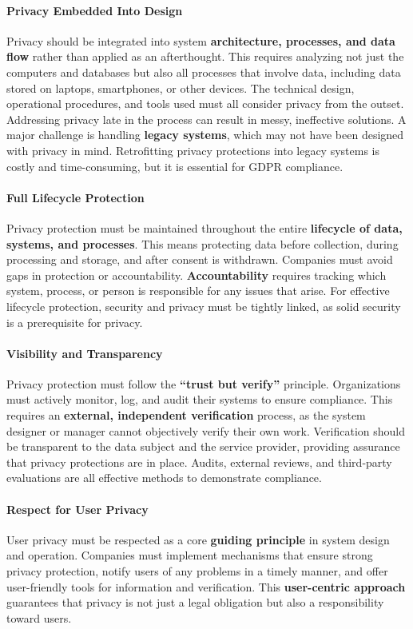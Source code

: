 \paragraph{Privacy Embedded Into Design}  
Privacy should be integrated into system \textbf{architecture,
processes, and data flow} rather than applied as an afterthought. This
requires analyzing not just the computers and databases but also all
processes that involve data, including data stored on laptops,
smartphones, or other devices. The technical design, operational
procedures, and tools used must all consider privacy from the outset.
Addressing privacy late in the process can result in messy,
ineffective solutions. A major challenge is handling \textbf{legacy
systems}, which may not have been designed with privacy in mind.
Retrofitting privacy protections into legacy systems is costly and
time-consuming, but it is essential for GDPR compliance.  

\paragraph{Full Lifecycle Protection}  
Privacy protection must be maintained throughout the entire
\textbf{lifecycle of data, systems, and processes}. This means
protecting data before collection, during processing and storage, and
after consent is withdrawn. Companies must avoid gaps in protection or
accountability. \textbf{Accountability} requires tracking which
system, process, or person is responsible for any issues that arise.
For effective lifecycle protection, security and privacy must be
tightly linked, as solid security is a prerequisite for privacy.  

\paragraph{Visibility and Transparency}  
Privacy protection must follow the \textbf{“trust but verify”}
principle. Organizations must actively monitor, log, and audit their
systems to ensure compliance. This requires an \textbf{external,
independent verification} process, as the system designer or manager
cannot objectively verify their own work. Verification should be
transparent to the data subject and the service provider, providing
assurance that privacy protections are in place. Audits, external
reviews, and third-party evaluations are all effective methods to
demonstrate compliance.  

\paragraph{Respect for User Privacy}  
User privacy must be respected as a core \textbf{guiding principle} in
system design and operation. Companies must implement mechanisms that
ensure strong privacy protection, notify users of any problems in a
timely manner, and offer user-friendly tools for information and
verification. This \textbf{user-centric approach} guarantees that
privacy is not just a legal obligation but also a responsibility
toward users.  

